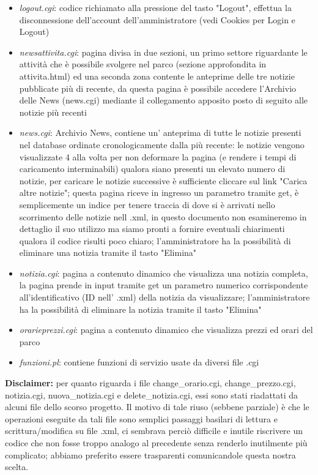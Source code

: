 \documentclass[12pt]{article}
\begin{document}
\begin{itemize}
\item \textit{logout.cgi}: codice richiamato alla pressione del tasto "Logout", effettua la disconnessione dell'account dell'amministratore (vedi Cookies per Login e Logout)
\item \textit{newsattivita.cgi}:  pagina divisa in due sezioni, un primo settore riguardante le attivit\`a che \`e possibile svolgere nel parco (sezione approfondita in attivita.html) ed una seconda zona contente le anteprime delle tre notizie pubblicate pi\`u di recente, da questa pagina \`e possibile accedere l'Archivio delle News (news.cgi) mediante il collegamento apposito posto di seguito alle notizie pi\`u recenti
\item \textit{news.cgi}: Archivio News, contiene un' anteprima di tutte le notizie presenti nel database ordinate cronologicamente dalla pi\`u recente: le notizie vengono visualizzate 4 alla volta per non deformare la pagina (e rendere i tempi di caricamento interminabili) qualora siano presenti un elevato numero di notizie, per caricare le notizie successive \`e sufficiente cliccare sul link "Carica altre notizie"; questa pagina riceve in ingresso un parametro tramite get, \`e semplicemente un indice per tenere traccia di dove si \`e arrivati nello scorrimento delle notizie nell .xml, in questo documento non esamineremo in dettaglio il suo utilizzo ma siamo pronti a fornire eventuali chiarimenti qualora il codice risulti poco chiaro; l'amministratore ha la possibilità di eliminare una notizia tramite il tasto "Elimina"
\item \textit{notizia.cgi}: pagina a contenuto dinamico che visualizza una notizia completa, la pagina prende in input tramite get un parametro numerico corrispondente all'identificativo (ID nell' .xml) della notizia da visualizzare; l'amministratore ha la possibilità di eliminare la notizia tramite il tasto "Elimina"
\item \textit{orarieprezzi.cgi}: pagina a contenuto dinamico che visualizza prezzi ed orari del parco
\item \textit{funzioni.pl}: contiene funzioni di servizio usate da diversi file .cgi
\end{itemize}	

\textbf{Disclaimer:} per quanto riguarda i file change\_orario.cgi, change\_prezzo.cgi, notizia.cgi, nuova\_notizia.cgi e delete\_notizia.cgi, essi sono stati riadattati da alcuni file dello scorso progetto. Il motivo di tale riuso (sebbene parziale) è che le operazioni eseguite da tali file sono semplici passaggi basilari di lettura e scrittura/modifica su file .xml, ci sembrava perciò difficile e inutile riscrivere un codice che non fosse troppo analogo al precedente senza renderlo inutilmente più complicato; abbiamo preferito essere trasparenti comunicandole questa nostra scelta.
\end{document}
